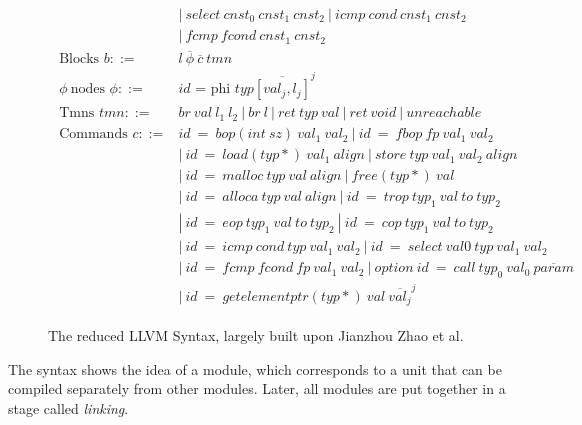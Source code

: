 \begin{figure}[!htb]
\begin{align*}
\begin{aligned}
&\mathit{|\ select\ cnst_{0}\ cnst_{1}\ cnst_{2}\ |\ icmp\ cond\ cnst_{1}\ cnst_{2}}\\
&\mathit{|\ fcmp\ fcond\ cnst_{1}\ cnst_{2}}\\
%
%
\text{Blocks } \mathit{b} ::= &\mathit{l\ \overline{\phi}\ \overline{c}\ tmn} \\
\phi\ \text{nodes } \phi ::= &\mathit{id} \text{ = phi } \mathit{typ \overline{[val_{j} , l_{j} ]}^{j}}\\
\text{Tmns } \mathit{tmn} ::= &\mathit{br\ val\ l_{1}\ l_{2} \ |\ br\ l \ |\ ret\ typ\ val\ |\ ret\ void\ |\ unreachable} \\
\text{Commands } \mathit{c} ::= &\mathit{id\ =\ bop(int\ sz)\ val_{1}\ val_{2}\ |\ id\ =\ fbop\ fp\ val_{1}\ val_{2}}\\
&\mathit{|\ id\ =\ load(typ*)\ val_{1}\ align\ |\ store\ typ\ val_{1}\ val_{2}\ align}\\
&\mathit{|\ id\ =\ malloc\ typ\ val\ align\ |\ free(typ * )\ val}\\
&\mathit{|\ id\ =\ alloca\ typ\ val\ align\ |\ id\ =\ trop\ typ_{1}\ val\ to\ typ_{2}}\\
&\mathit{|\ id\ =\ eop\ typ_{1}\ val\ to\ typ_{2}\ |\ id\ =\ cop\ typ_{1}\ val\ to\ typ_{2}}\\
&\mathit{|\ id\ =\ icmp\ cond\ typ\ val_{1}\ val_{2}\ |\ id\ =\ select\ val0\ typ\ val_{1}\ val_{2}\ }\\
&\mathit{|\ id\ =\ fcmp\ fcond\ fp\ val_{1}\ val_{2}\ |\ option\ id\ =\ call\ typ_{0}\ val_{0}\ \overline{param}}\\
&\mathit{|\ id\ =\ getelementptr(typ*)\ val\ \overline{val_{j}}^{j}}
\end{aligned}
\end{align*}
\caption[Syntax: LLVM]{The reduced LLVM Syntax, largely built upon Jianzhou Zhao et al. \cite{Zhao:2012:FLI:2103656.2103709} \label{fig:LLVMSyntax}}
\end{figure}

The syntax shows the idea of a module, which corresponds to a unit that can be compiled separately from other modules.
Later, all modules are put together in a stage called \emph{linking}.

